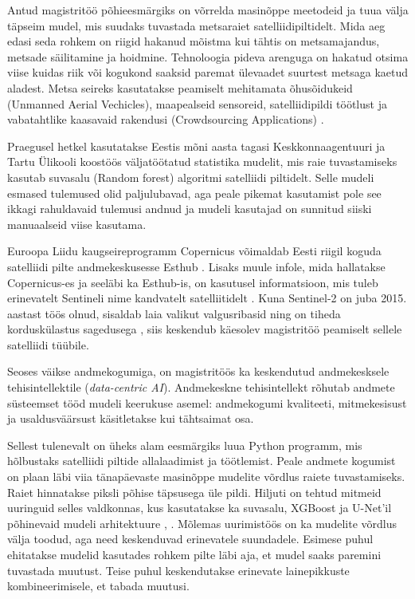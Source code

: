 Antud magistritöö põhieesmärgiks on võrrelda masinõppe meetodeid ja tuua välja täpseim mudel, mis suudaks tuvastada metsaraiet satelliidipiltidelt. Mida aeg edasi seda rohkem on riigid hakanud mõistma kui tähtis on metsamajandus, metsade säilitamine ja hoidmine. Tehnoloogia pideva arenguga on hakatud otsima viise kuidas riik või kogukond saaksid paremat ülevaadet suurtest metsaga kaetud aladest. Metsa seireks kasutatakse peamiselt mehitamata õhusõidukeid (Unmanned Aerial Vechicles), maapealseid sensoreid, satelliidipildi töötlust ja vabatahtlike kaasavaid rakendusi (Crowdsourcing Applications) \cite{cheungPerimeterDefense42015}.

Praegusel hetkel kasutatakse Eestis mõni aasta tagasi Keskkonnaagentuuri ja Tartu Ülikooli koostöös väljatöötatud statistika mudelit, mis raie tuvastamiseks kasutab suvasalu (Random forest) algoritmi \cite{TartuUlikooliTeadlased2020} satelliidi piltidelt. Selle mudeli esmased tulemused olid paljulubavad, aga peale pikemat kasutamist pole see ikkagi rahuldavaid tulemusi andnud ja mudeli kasutajad on sunnitud siiski manuaalseid viise kasutama.

Euroopa Liidu kaugseireprogramm Copernicus võimaldab Eesti riigil koguda satelliidi pilte andmekeskusesse Esthub \cite{maa-ametRiiklikSatelliidiandmeteKeskus}. Lisaks muule infole, mida hallatakse Copernicus-es ja seeläbi ka Esthub-is, on kasutusel informatsioon, mis tuleb erinevatelt Sentineli nime kandvatelt satelliitidelt \cite{InfrastructureOverviewCopernicus}. Kuna Sentinel-2 on juba 2015. aastast töös olnud, sisaldab laia valikut valgusribasid ning on tiheda korduskülastus sagedusega \cite{Sentinel2OverviewScienceDirect}, siis keskendub käesolev magistritöö peamiselt sellele satelliidi tüübile.

Seoses väikse andmekogumiga, on magistritöös ka keskendutud andmekesksele tehisintellektile (\textit{data-centric AI}). Andmekeskne tehisintellekt rõhutab andmete süsteemset tööd mudeli keerukuse asemel: andmekogumi kvaliteeti, mitmekesisust ja usaldusväärsust käsitletakse kui tähtsaimat osa.

Sellest tulenevalt on üheks alam eesmärgiks luua Python programm, mis hõlbustaks satelliidi piltide allalaadimist ja töötlemist. Peale andmete kogumist on plaan läbi viia tänapäevaste masinõppe mudelite võrdlus raiete tuvastamiseks. Raiet hinnatakse piksli põhise täpsusega üle pildi. Hiljuti on tehtud mitmeid uuringuid selles valdkonnas, kus kasutatakse ka suvasalu, XGBoost ja U-Net’il põhinevaid mudeli arhitektuure \cite{isaienkovDeepLearningRegular2021}, \cite{podoprigorovaRecognitionForestDamage2024}. Mõlemas uurimistöös on ka mudelite võrdlus välja toodud, aga need keskenduvad erinevatele suundadele. Esimese puhul ehitatakse mudelid kasutades rohkem pilte läbi aja, et mudel saaks paremini tuvastada muutust. Teise puhul keskendutakse erinevate lainepikkuste kombineerimisele, et tabada muutusi. 

